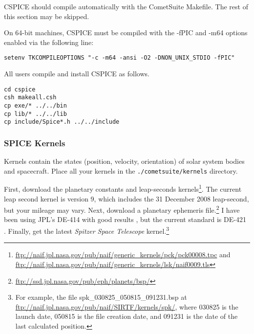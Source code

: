 \documentclass[12pt,letterpaper]{article}
\newcommand\sst{\textit{Spitzer Space Telescope}}
\newcommand\cs{CometSuite}
\begin{document}
CSPICE should compile automatically with the \cs{} Makefile.  The rest
of this section may be skipped.

On 64-bit machines, CSPICE must be compiled with the -fPIC and -m64
options enabled via the following line:
\begin{lstlisting}
setenv TKCOMPILEOPTIONS "-c -m64 -ansi -O2 -DNON_UNIX_STDIO -fPIC"
\end{lstlisting}
All users compile and install CSPICE as follows.
\begin{lstlisting}
cd cspice
csh makeall.csh
cp exe/* ../../bin
cp lib/* ../../lib
cp include/Spice*.h ../../include
\end{lstlisting}

\subsubsection{SPICE Kernels}
Kernels contain the states (position, velocity, orientation) of solar
system bodies and spacecraft.  Place all your kernels in the
\texttt{./cometsuite/kernels} directory.

First, download the planetary constants and leap-seconds
kernels\footnote{\url{ftp://naif.jpl.nasa.gov/pub/naif/generic_kernels/pck/pck00008.tpc}
  and
  \url{ftp://naif.jpl.nasa.gov/pub/naif/generic_kernels/lsk/naif0009.tls}}.
The current leap second kernel is version 9, which includes the 31
December 2008 leap-second, but your mileage may vary.  Next, download
a planetary ephemeris
file.\footnote{\url{ftp://ssd.jpl.nasa.gov/pub/eph/planets/bsp/}} I
have been using JPL's DE-414 with good results \citep{standish06}, but
the current standard is DE-421 \citep{folkner08}.  Finally, get the
latest \sst{} kernel.\footnote{For example, the file
  spk\_030825\_050815\_091231.bsp at
  \url{ftp://naif.jpl.nasa.gov/pub/naif/SIRTF/kernels/spk/}, where
  030825 is the launch date, 050815 is the file creation date, and
  091231 is the date of the last calculated position.}
\end{document}
